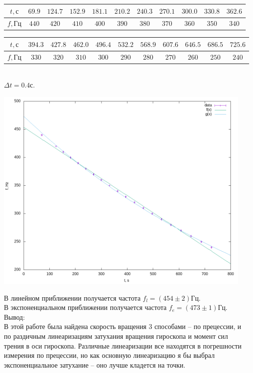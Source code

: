\documentclass[a4paper,12pt]{article}
\begin{document}
\begin{center}
\begin{tabular}{|c|c|c|c|c|c|c|c|c|c|c|}
\hline
$t, \text{с}$ & $69.9$ & $124.7$ & $152.9$ & $181.1$ & $210.2$ & $240.3$ & $270.1$ & $300.0$ & $330.8$ & $362.6$ \\
\hline
$f, \text{Гц}$ & $440$ & $420$ & $410$ & $400$ & $390$ & $380$ & $370$ & $360$ & $350$ & $340$ \\
\hline
\end{tabular}
\end{center}
\begin{center}
\begin{tabular}{|c|c|c|c|c|c|c|c|c|c|c|}
\hline
$t, \text{с}$ & $394.3$ & $427.8$ & $462.0$ & $496.4$ & $532.2$ & $568.9$ & $607.6$ & $646.5$ & $686.5$ & $725.6$ \\
\hline
$f, \text{Гц}$ & $330$ & $320$ & $310$ & $300$ & $290$ & $280$ & $270$ & $260$ & $250$ & $240$\\
\hline
\end{tabular}\\[0.2cm]
$\Delta t = 0.4 \text{с}.$
\end{center}
\begin{center}
	\includegraphics[width=0.95\textwidth]{f.png}
\end{center}

В линейном приближении получается частота $f_l = (454\pm 2) \text{Гц}$.\\
В экспоненциальном приближении получается частота $f_e = (473\pm 1) \text{Гц}$.\\
\newpage
Вывод:\\
В этой работе была найдена скорость вращения 3 способами -- по прецессии, и по раздичным линеаризациям затухания вращения гироскопа и момент сил трения в оси гироскопа. Различные линеаризации все находятся в погрешности измерения по прецессии, но как основную линеаризацию я бы выбрал экспоненциальное затухание -- оно лучше кладется на точки.
\end{document}
